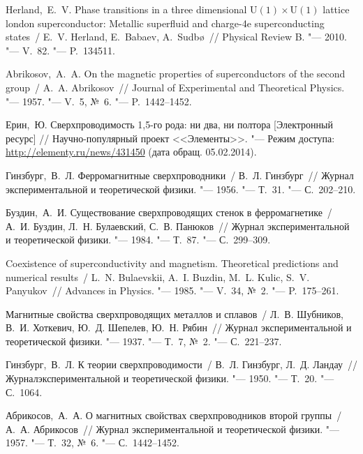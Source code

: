 \begin{thebibliography}{10}
     Herland,~E.~V. Phase transitions in a three dimensional 
        \( \mathrm{U(1)\times U(1)} \) lattice london superconductor: 
        Metallic superfluid and charge-4e superconducting states~/ 
        E.~V. Herland, E.~Babaev, A.~Sudb\o{}~// Physical Review B. "--- 
        2010. "--- V.~82. "--- P.~134511.

     Abrikosov,~A.~A. On the magnetic properties of 
        superconductors of the second group~/ A.~A. Abrikosov~// 
        Journal of Experimental and Theoretical Physics. "--- 1957. "---
        V.~5, №~6. "--- P.~1442--1452.

     Ерин,~Ю. Сверхпроводимость 1,5-го рода: 
        ни два, ни полтора [Электронный ресурс] // 
        Научно-популярный проект <<Элементы>>. "--- Режим доступа: 
        \url{http://elementy.ru/news/431450} (дата обращ. 05.02.2014).

     Гинзбург,~В.~Л. Ферромагнитные сверхпроводники~/ 
        В.~Л. Гинзбург~// Журнал экспериментальной и теоретической физики. "---
        1956. "--- Т.~31. "--- С.~202--210.

     Буздин,~А.~И. Существование сверхпроводящих стенок в 
        ферромагнетике~/ А.~И. Буздин, Л.~Н. Булаевский, С.~В. Панюков~// 
        Журнал экспериментальной и теоретической физики. "--- 1984. "---
        Т.~87. "--- С.~299--309.

     Coexistence of superconductivity and magnetism. 
        Theoretical predictions and numerical results~/ L.~N. Bulaevskii, 
        A.~I. Buzdin, M.~L. Kulic, S.~V. Panyukov~// Advances in Physics. "---
        1985. "--- V.~34, №~2. "--- P.~175--261.

     Магнитные свойства сверхпроводящих металлов и 
        сплавов~/ Л.~В. Шубников, В.~И. Хоткевич, Ю.~Д. Шепелев, 
        Ю.~Н. Рябин~// Журнал экспериментальной и теоретической физики. "---
        1937. "--- Т.~7, №~2. "--- С.~221--237.

     Гинзбург,~В.~Л. К теории сверхпроводимости~/
        В.~Л. Гинзбург, Л.~Д. Ландау~// Журналэкспериментальной и теоретической
        физики. "--- 1950. "--- Т.~20. "--- С.~1064.

     Абрикосов,~А.~А. О магнитных свойствах 
        сверхпроводников второй группы~/ А.~А. Абрикосов~// 
        Журнал экспериментальной и теоретической физики. "--- 1957. "---
        Т.~32, №~6. "--- С.~1442--1452.


\end{thebibliography}
